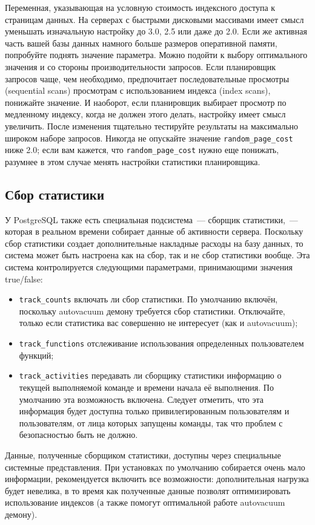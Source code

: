 \begin{itemize}
  Переменная, указывающая на условную стоимость индексного доступа к страницам данных. На серверах с быстрыми дисковыми массивами имеет смысл уменьшать изначальную настройку до 3.0, 2.5 или даже до 2.0. Если же активная часть вашей базы данных намного больше размеров оперативной памяти, попробуйте поднять значение параметра. Можно подойти к выбору оптимального значения и со стороны производительности запросов. Если планировщик запросов чаще, чем необходимо, предпочитает последовательные просмотры (sequential scans) просмотрам с использованием индекса (index scans), понижайте значение. И наоборот, если планировщик выбирает просмотр по медленному индексу, когда не должен этого делать, настройку имеет смысл увеличить. После изменения тщательно тестируйте результаты на максимально широком наборе запросов. Никогда не опускайте значение \lstinline!random_page_cost! ниже 2.0; если вам кажется, что \lstinline!random_page_cost! нужно еще понижать, разумнее в этом случае менять настройки статистики планировщика.
\end{itemize}

\subsection{Сбор статистики}

У PostgreSQL также есть специальная подсистема~--- сборщик статистики,~--- которая в реальном времени собирает данные об активности сервера. Поскольку сбор статистики создает дополнительные накладные расходы на базу данных, то система может быть настроена как на сбор, так и не сбор статистики вообще. Эта система контролируется следующими параметрами, принимающими значения true/false:

\begin{itemize}
  \item \lstinline!track_counts! включать ли сбор статистики. По умолчанию включён, поскольку autovacuum демону требуется сбор статистики. Отключайте, только если статистика вас совершенно не интересует (как и autovacuum);
  \item \lstinline!track_functions! отслеживание использования определенных пользователем функций;
  \item \lstinline!track_activities! передавать ли сборщику статистики информацию о текущей выполняемой команде и времени начала её выполнения. По умолчанию эта возможность включена. Следует отметить, что эта информация будет доступна только привилегированным пользователям и пользователям, от лица которых запущены команды, так что проблем с безопасностью быть не должно.
\end{itemize}

Данные, полученные сборщиком статистики, доступны через специальные системные представления. При установках по умолчанию собирается очень мало информации, рекомендуется включить все возможности: дополнительная нагрузка будет невелика, в то время как полученные данные позволят оптимизировать использование индексов (а также помогут оптимальной работе autovacuum демону).